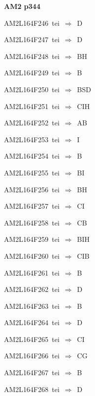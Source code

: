 \par\vfill\eject
{\bf\hfill AM2 p344\hfill\hbox{}}\par\bigskip
{\sixrm AM2L164F246\ {\sixit tei}\ }$\Rightarrow$\ D\par\smallskip
{\sixrm AM2L164F247\ {\sixit tei}\ }$\Rightarrow$\ D\par\smallskip
{\sixrm AM2L164F248\ {\sixit tei}\ }$\Rightarrow$\ BH\par\smallskip
{\sixrm AM2L164F249\ {\sixit tei}\ }$\Rightarrow$\ B\par\smallskip
{\sixrm AM2L164F250\ {\sixit tei}\ }$\Rightarrow$\ BSD\par\smallskip
{\sixrm AM2L164F251\ {\sixit tei}\ }$\Rightarrow$\ CIH\par\smallskip
{\sixrm AM2L164F252\ {\sixit tei}\ }$\Rightarrow$\ AB\par\smallskip
{\sixrm AM2L164F253\ {\sixit tei}\ }$\Rightarrow$\ I\par\smallskip
{\sixrm AM2L164F254\ {\sixit tei}\ }$\Rightarrow$\ B\par\smallskip
{\sixrm AM2L164F255\ {\sixit tei}\ }$\Rightarrow$\ BI\par\smallskip
{\sixrm AM2L164F256\ {\sixit tei}\ }$\Rightarrow$\ BH\par\smallskip
{\sixrm AM2L164F257\ {\sixit tei}\ }$\Rightarrow$\ CI\par\smallskip
{\sixrm AM2L164F258\ {\sixit tei}\ }$\Rightarrow$\ CB\par\smallskip
{\sixrm AM2L164F259\ {\sixit tei}\ }$\Rightarrow$\ BIH\par\smallskip
{\sixrm AM2L164F260\ {\sixit tei}\ }$\Rightarrow$\ CIB\par\smallskip
{\sixrm AM2L164F261\ {\sixit tei}\ }$\Rightarrow$\ B\par\smallskip
{\sixrm AM2L164F262\ {\sixit tei}\ }$\Rightarrow$\ D\par\smallskip
{\sixrm AM2L164F263\ {\sixit tei}\ }$\Rightarrow$\ B\par\smallskip
{\sixrm AM2L164F264\ {\sixit tei}\ }$\Rightarrow$\ D\par\smallskip
{\sixrm AM2L164F265\ {\sixit tei}\ }$\Rightarrow$\ CI\par\smallskip
{\sixrm AM2L164F266\ {\sixit tei}\ }$\Rightarrow$\ CG\par\smallskip
{\sixrm AM2L164F267\ {\sixit tei}\ }$\Rightarrow$\ B\par\smallskip
{\sixrm AM2L164F268\ {\sixit tei}\ }$\Rightarrow$\ D\par\smallskip
